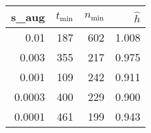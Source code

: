 \documentclass[12pt]{article}
\begin{document}
\begin{description}
  \begin{tabular*}{1.0\linewidth}{rrrr} \\
    s\_aug &$t_{\text{min}}$&$n_{\text{min}}$&$\hat h$ \\ \hline
    0.01   &187           &602           & 1.008 \\ 
    0.003  &355           &217           & 0.975 \\
    0.001  &109           &242           & 0.911 \\
    0.0003 &400           &229           & 0.900 \\
    0.0001 &461           &199           & 0.943
  \end{tabular*}
\end{description}
\end{document}
